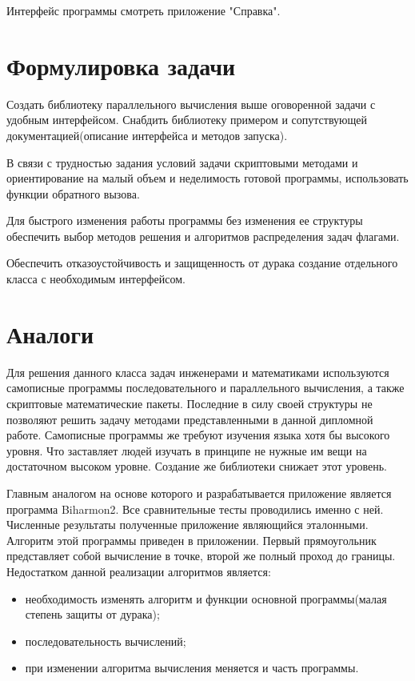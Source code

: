 Интерфейс программы смотреть приложение "Справка".

\section{Формулировка задачи}
Создать библиотеку параллельного вычисления выше оговоренной задачи с удобным интерфейсом. Снабдить библиотеку примером и сопутствующей документацией(описание интерфейса и методов запуска).

В связи с трудностью задания условий задачи скриптовыми методами и ориентирование на малый объем и неделимость готовой программы, использовать функции обратного вызова.

Для быстрого изменения работы программы без изменения ее структуры обеспечить выбор методов решения и алгоритмов распределения задач флагами.

Обеспечить отказоустойчивость и защищенность от дурака создание отдельного класса с необходимым интерфейсом.
\section{Аналоги}
Для решения данного класса задач инженерами и математиками используются самописные программы последовательного и параллельного вычисления, а также скриптовые математические пакеты. Последние в силу своей структуры не позволяют решить задачу методами представленными в данной дипломной работе.
Самописные программы же %
требуют изучения языка хотя бы высокого уровня. Что заставляет людей изучать в принципе не нужные им вещи на достаточном высоком уровне. Создание же библиотеки снижает этот уровень.

Главным аналогом на основе которого и разрабатывается приложение является программа Biharmon2. 
Все сравнительные тесты проводились именно с ней. Численные результаты полученные приложение являющийся эталонными.
Алгоритм этой программы приведен в приложении.  Первый прямоугольник представляет собой вычисление в точке, второй же полный проход до границы. Недостатком данной реализации алгоритмов является:
\begin{itemize}
	\item необходимость изменять алгоритм и функции основной программы(малая степень защиты от дурака);
	\item последовательность вычислений;
	\item при изменении алгоритма вычисления меняется и часть программы.
\end{itemize}
